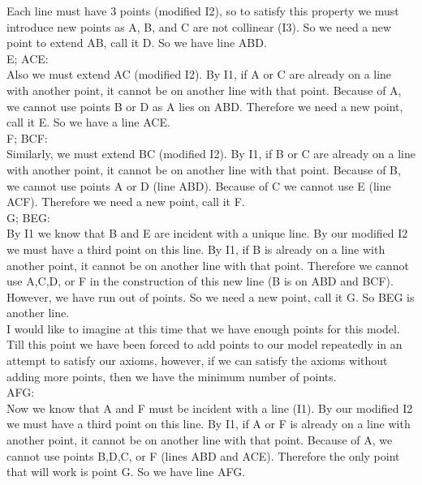 \documentclass[12pt,letterpaper]{article}
\begin{document}
Each line must have 3 points (modified I2), so to satisfy this property we must introduce new points as A, B, and C are not collinear (I3). So we need a new point to extend AB, call it D.  So we have line ABD.  \\

\noindent E; ACE:\\

Also we must extend AC (modified I2).  By I1, if A or C are already on a line with another point, it cannot be on another line with that point.  Because of A, we cannot use points B or D as A lies on ABD.  Therefore we need a new point, call it E.  So we have a line ACE.\\


\noindent F; BCF:\\

Similarly, we must extend BC (modified I2).  By I1, if B or C are already on a line with another point, it cannot be on another line with that point.  Because of B, we cannot use points A or D (line ABD).  Because of C we cannot use E (line ACF).  Therefore we need a new point, call it F. \\

\noindent G; BEG:\\
 
By I1 we know that B and E are incident with a unique line.  By our modified I2 we must have a third point on this line.  By I1, if B is already on a line with another point, it cannot be on another line with that point.  Therefore we cannot use A,C,D, or F in the construction of this new line (B is on ABD and BCF).  However, we have run out of points.  So we need a new point, call it G. So BEG is another line. \\
 
I would like to imagine at this time that we have enough points for this model.  Till this point we have been forced to add points to our model repeatedly in an attempt to satisfy our axioms, however, if we can satisfy the axioms without adding more points, then we have the minimum number of points. \\  
 
\noindent AFG:\\

Now we know that A and F must be incident with a line (I1).  By our modified I2 we must have a third point on this line.  By I1, if A or F is already on a line with another point, it cannot be on another line with that point. Because of A, we cannot use points B,D,C, or F (lines ABD and ACE).  Therefore the only point that will work is point G.  So we have line AFG. \\
\end{document}
